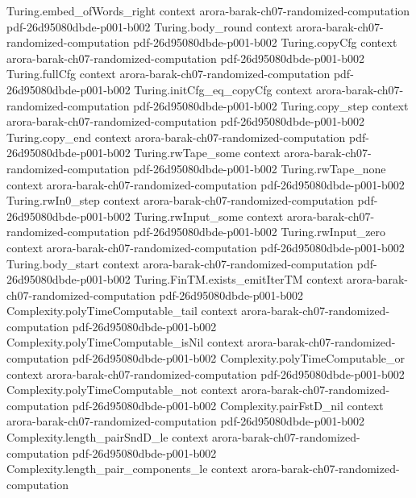 \begin{theorem}
\proofstep
  {Turing.embed_ofWords_right}
  {context}
  {arora-barak-ch07-randomized-computation}
  {pdf-26d95080dbde-p001-b002}
\proofstep
  {Turing.body_round}
  {context}
  {arora-barak-ch07-randomized-computation}
  {pdf-26d95080dbde-p001-b002}
\proofstep
  {Turing.copyCfg}
  {context}
  {arora-barak-ch07-randomized-computation}
  {pdf-26d95080dbde-p001-b002}
\proofstep
  {Turing.fullCfg}
  {context}
  {arora-barak-ch07-randomized-computation}
  {pdf-26d95080dbde-p001-b002}
\proofstep
  {Turing.initCfg_eq_copyCfg}
  {context}
  {arora-barak-ch07-randomized-computation}
  {pdf-26d95080dbde-p001-b002}
\proofstep
  {Turing.copy_step}
  {context}
  {arora-barak-ch07-randomized-computation}
  {pdf-26d95080dbde-p001-b002}
\proofstep
  {Turing.copy_end}
  {context}
  {arora-barak-ch07-randomized-computation}
  {pdf-26d95080dbde-p001-b002}
\proofstep
  {Turing.rwTape_some}
  {context}
  {arora-barak-ch07-randomized-computation}
  {pdf-26d95080dbde-p001-b002}
\proofstep
  {Turing.rwTape_none}
  {context}
  {arora-barak-ch07-randomized-computation}
  {pdf-26d95080dbde-p001-b002}
\proofstep
  {Turing.rwIn0_step}
  {context}
  {arora-barak-ch07-randomized-computation}
  {pdf-26d95080dbde-p001-b002}
\proofstep
  {Turing.rwInput_some}
  {context}
  {arora-barak-ch07-randomized-computation}
  {pdf-26d95080dbde-p001-b002}
\proofstep
  {Turing.rwInput_zero}
  {context}
  {arora-barak-ch07-randomized-computation}
  {pdf-26d95080dbde-p001-b002}
\proofstep
  {Turing.body_start}
  {context}
  {arora-barak-ch07-randomized-computation}
  {pdf-26d95080dbde-p001-b002}
\proofstep
  {Turing.FinTM.exists_emitIterTM}
  {context}
  {arora-barak-ch07-randomized-computation}
  {pdf-26d95080dbde-p001-b002}
\proofstep
  {Complexity.polyTimeComputable_tail}
  {context}
  {arora-barak-ch07-randomized-computation}
  {pdf-26d95080dbde-p001-b002}
\proofstep
  {Complexity.polyTimeComputable_isNil}
  {context}
  {arora-barak-ch07-randomized-computation}
  {pdf-26d95080dbde-p001-b002}
\proofstep
  {Complexity.polyTimeComputable_or}
  {context}
  {arora-barak-ch07-randomized-computation}
  {pdf-26d95080dbde-p001-b002}
\proofstep
  {Complexity.polyTimeComputable_not}
  {context}
  {arora-barak-ch07-randomized-computation}
  {pdf-26d95080dbde-p001-b002}
\proofstep
  {Complexity.pairFstD_nil}
  {context}
  {arora-barak-ch07-randomized-computation}
  {pdf-26d95080dbde-p001-b002}
\proofstep
  {Complexity.length_pairSndD_le}
  {context}
  {arora-barak-ch07-randomized-computation}
  {pdf-26d95080dbde-p001-b002}
\proofstep
  {Complexity.length_pair_components_le}
  {context}
  {arora-barak-ch07-randomized-computation}

\end{theorem}

